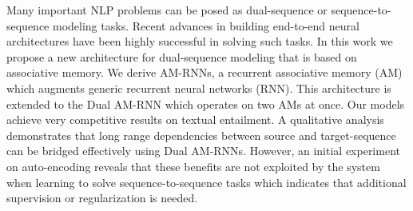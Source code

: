 Many important NLP problems can be posed as dual-sequence or sequence-to-sequence modeling tasks. Recent advances in building end-to-end neural architectures have been highly successful in solving such tasks. In this work we propose a new architecture for dual-sequence modeling that is based on associative memory. We derive AM-RNNs, a recurrent associative memory (AM) which augments generic recurrent neural networks (RNN). This architecture is extended to the Dual AM-RNN which operates on two AMs at once. Our models achieve very competitive results on textual entailment. A qualitative analysis demonstrates that long range dependencies between source and target-sequence can be bridged effectively using Dual AM-RNNs. However, an initial experiment on auto-encoding reveals that these benefits are not exploited by the system when learning to solve sequence-to-sequence tasks which indicates that additional supervision or regularization is needed.
